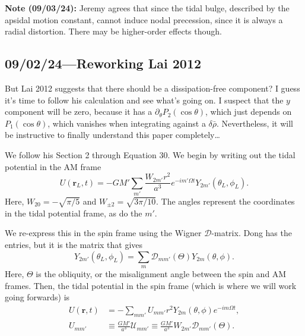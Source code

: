 \documentclass[12pt]{article}
\newcommand*{\bm}[1]{\boldsymbol{\mathbf{#1}}}
\newcommand*{\p}[1]{\left(#1\right)}
\begin{document}
\textbf{Note (09/03/24):} Jeremy agrees that since the tidal bulge, described by
the apsidal motion constant, cannot induce nodal precession, since it is always
a radial distortion. There may be higher-order effects though.

\subsection{09/02/24---Reworking Lai 2012}

But Lai 2012 suggests that there should be a dissipation-free component? I guess
it's time to follow his calculation and see what's going on. I suspect that the
$y$ component will be zero, because it has a $\partial_\theta P_2(\cos\theta)$,
which just depends on $P_1(\cos\theta)$, which vanishes when integrating against
a $\delta \bar{\rho}$. Nevertheless, it will be instructive to finally
understand this paper completely\dots

We follow his Section 2 through Equation 30. We begin by writing out the tidal
potential in the AM frame
\begin{equation}
    U\p{\bm{r}_L, t} = -GM'
        \sum\limits_{m'} \frac{W_{2m'}r^2}{a^3}
            e^{-im' \Omega t}Y_{2m'}\p{\theta_L, \phi_L}.
\end{equation}
Here, $W_{20} = -\sqrt{\pi/5}$ and $W_{\pm 2} = \sqrt{3\pi / 10}$. The angles
represent the coordinates in the tidal potential frame, as do the $m'$.

We re-express this in the spin frame using the Wigner $\mathcal{D}$-matrix. Dong
has the entries, but it is the matrix that gives
\begin{equation}
    Y_{2m'}\p{\theta_L, \phi_L}
        = \sum\limits_m \mathcal{D}_{mm'}(\Theta)Y_{2m}\p{\theta, \phi}.
\end{equation}
Here, $\Theta$ is the obliquity, or the misalignment angle between the spin and
AM frames. Then, the tidal potential in the spin frame (which is where we will
work going forwards) is
\begin{align}
    U\p{\bm{r}, t}
        &= -\sum\limits_{mm'} U_{mm'} r^2Y_{2m}\p{\theta, \phi}
            e^{-im \Omega t},\\
    U_{mm'}
        &\equiv \frac{GM'}{a^3}\mathcal{U}_{mm'}
        \equiv \frac{GM'}{a^3}W_{2m'}\mathcal{D}_{mm'}(\Theta).
\end{align}
\end{document}
